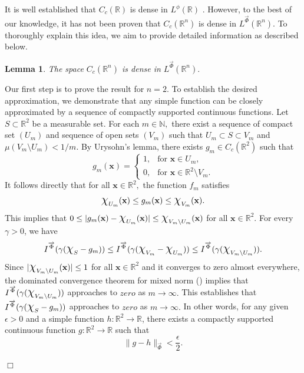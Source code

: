 \documentclass[11pt, a4paper]{article}
\newtheorem{lemma}[thm]{Lemma}
\theoremstyle{definition}
\newcommand{\qedwhite}{\hfill \ensuremath{\Box}}
\renewenvironment{proof}{{\raggedright \bfseries Proof.}}{\qedwhite}
\numberwithin{equation}{section}
\def\NN{\mathbb N}
\def\RR{\mathbb R}
\def\Chi{\mbox{\Large$\chi$}}
\newcommand{\vc}[1]{\overrightarrow{#1}}
\begin{document}
 It is well established that $C_{c}(\RR)$ is dense in $L^{\phi}(\RR)$ \cite[Theorem 7.6]{mod}. However, to the best of our knowledge, it has not been proven that $C_{c}(\RR^{n})$  is dense in $ L^{\overrightarrow{\Phi}}(\mathbb{R}^n).$ 
To thoroughly explain this idea, we aim to provide detailed information as described below.
 \begin{lemma} \label{ce}
             The space $C_{c}(\RR^{n})$ is dense in $ L^{\overrightarrow{\Phi}}(\mathbb{R}^n).$ 
   \end{lemma}
\begin{proof}
	Our first step is to prove the result for $n=2.$ 
	To establish the desired approximation, we demonstrate that any simple function can be closely approximated by a sequence of compactly supported continuous functions.
	Let $S \subset \RR^2$ be a measurable set. For each $m \in \NN,$ there exist a sequence of compact set $(U_m)$ and sequence of open sets $( V_m)$ such that $U_m \subset S \subset  V_m$ and $\mu( V_m \setminus U_m)<1/m.$ By Urysohn’s lemma, there exists $g_m \in C_c(\RR^2)$ such that
	$$g_m(\textbf{x}) = 
	\begin{cases} 
		1, & \text{for } \textbf{x} \in U_m, \\
		0, & \text{for } \textbf{x} \in \RR^2 \setminus  V_m.
	\end{cases}$$
It follows directly that for all $\textbf{x} \in \RR^2,$  the function $f_m$ satisfies $$\Chi_{U_m}(\textbf{x})\leq  g_m(\textbf{x}) \leq  \Chi_{ V_m}(\textbf{x}).$$  
This implies that $0 \leq |g_m(\textbf{x})-\Chi_{U_m}(\textbf{x})|\leq \Chi_{ V_m \setminus U_m}(\textbf{x})$ for all $\textbf{x} \in \RR^2.$ For every $\gamma >0$, we have
	$$I^{\overrightarrow{{\Phi}}} (\gamma(\Chi_S - g_m ))  
	\leq I^{\overrightarrow{{\Phi}}}(\gamma(\Chi_{ V_m} - \Chi_{U_m} ))  
	\leq I^{\overrightarrow{{\Phi}}}(\gamma( \Chi_{ V_m \setminus U_m} )).$$
Since \( |\Chi_{ V_m\setminus U_m}(\textbf{x})| \leq 1 \) for all \( \textbf{x} \in \mathbb{R}^2 \) and it converges to zero almost everywhere, the dominated convergence theorem for mixed norm (\cite[Section 2]{dct}) implies that  $I^{\overrightarrow{{\Phi}}}(\gamma( \Chi_{ V_m \setminus U_m} )) $ approaches to $zero$  as $m \to \infty.$ 
This establishes that  $I^{\overrightarrow{{\Phi}}} (\gamma(\Chi_S - g_m )) $  approaches to $zero$  as $m \to \infty.$  In other words, for any given $\epsilon>0$ and a simple function $h : \RR^2 \rightarrow \RR$, there exists a compactly supported  continuous function $g:\RR^2 \rightarrow\RR$  such that  
\begin{equation}\label{g1}
\|g-h\|_{\vc{\Phi}}<\frac{\epsilon}{2}.
\end{equation}




\end{proof}
\end{document}
